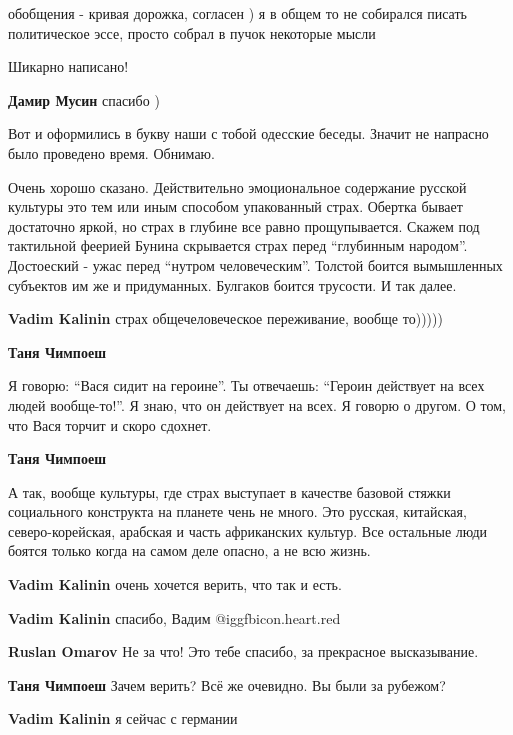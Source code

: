 \begin{itemize}
обобщения - кривая дорожка, согласен ) я в общем то не собирался писать
политическое эссе, просто собрал в пучок некоторые мысли

Шикарно написано!

\textbf{Дамир Мусин} спасибо )


Вот и оформились в букву наши с тобой одесские беседы. Значит не напрасно было
проведено время. Обнимаю.


Очень хорошо сказано. Действительно эмоциональное содержание русской культуры
это тем или иным способом упакованный страх. Обертка бывает достаточно яркой,
но страх в глубине все равно прощупывается. Скажем под тактильной феерией
Бунина скрывается страх перед \enquote{глубинным народом}. Достоеский - ужас перед
\enquote{нутром человеческим}. Толстой боится вымышленных субъектов им же и
придуманных. Булгаков боится трусости. И так далее.

\begin{itemize} %
\textbf{Vadim Kalinin} страх общечеловеческое переживание, вообще то)))))

\textbf{Таня Чимпоеш} 

Я говорю: \enquote{Вася сидит на героине}. Ты отвечаешь: \enquote{Героин действует на всех людей
вообще-то!}. Я знаю, что он действует на всех. Я говорю о другом. О том, что
Вася торчит и скоро сдохнет.

\textbf{Таня Чимпоеш} 

А так, вообще культуры, где страх выступает в качестве базовой стяжки
социального конструкта на планете чень не много. Это русская, китайская,
северо-корейская, арабская и часть африканских культур. Все остальные люди
боятся только когда на самом деле опасно, а не всю жизнь.

\textbf{Vadim Kalinin} очень хочется верить, что так и есть.

\textbf{Vadim Kalinin} спасибо, Вадим @igg{fbicon.heart.red}

\textbf{Ruslan Omarov} Не за что! Это тебе спасибо, за прекрасное высказывание.

\textbf{Таня Чимпоеш} Зачем верить? Всё же очевидно. Вы были за рубежом?

\textbf{Vadim Kalinin} я сейчас с германии


\end{itemize}
\end{itemize}
